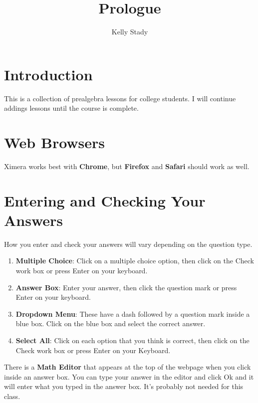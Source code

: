 \documentclass{ximera}[font=12pt]
\title{Prologue}   %
\author{Kelly Stady}
\begin{document}
\begin{abstract}

\end{abstract}

\maketitle
\label{xim:prologue}

\section*{Introduction}

This is a collection of prealgebra lessons for college students.  I will continue addings lessons until the course
is complete.    


\section*{Web Browsers}

Ximera works best with \textbf{Chrome}, but \textbf{Firefox} and \textbf{Safari} should work as well. 


\section*{Entering and Checking Your Answers}

How you enter and check your answers will vary depending on the question type.  

\begin{enumerate}
\item \textbf{Multiple Choice}: Click on a multiple choice option, then click on the Check work box or press Enter on your keyboard. 

\item \textbf{Answer Box}:  Enter your answer, then click the question mark or press Enter on your keyboard. 

\item \textbf{Dropdown Menu}:  These have a dash followed by a question mark inside a blue box.  Click on the blue box and select
the correct answer. 

\item \textbf{Select All}: Click on each option that you think is correct, then click on the Check work box or press 
Enter on your Keyboard.
\end{enumerate}

There is a \textbf{Math Editor} that appears at the top of the webpage when you click inside an answer box.  You can type your
answer in the editor and click Ok and it will enter what you typed in the answer box. It's probably not needed for this class.  
  
\end{document}

